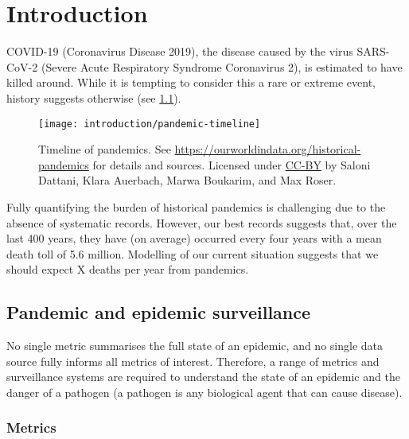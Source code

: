 \documentclass[thesis.tex]{subfiles}
\begin{document}
\chapter{Introduction} \label{intro}

COVID-19 (Coronavirus Disease 2019), the disease caused by the virus SARS-CoV-2 (Severe Acute Respiratory Syndrome Coronavirus 2), is estimated to have killed around.
While it is tempting to consider this a rare or extreme event, history suggests otherwise (see \cref{intro:fig:pandemic-timeline}).
\begin{figure}
    \texttt{[image: introduction/pandemic-timeline]}
    \caption[Timeline of pandemics.]{%
        Timeline of pandemics.
        See \url{https://ourworldindata.org/historical-pandemics} for details and sources.
        Licensed under \href{https://creativecommons.org/licenses/by/4.0/}{CC-BY} by Saloni Dattani, Klara Auerbach, Marwa Boukarim, and Max Roser.
    }
    \label{intro:fig:pandemic-timeline}
\end{figure}

Fully quantifying the burden of historical pandemics is challenging due to the absence of systematic records.
However, our best records suggests that, over the last 400 years, they have (on average) occurred every four years with a mean death toll of 5.6 million.
Modelling of our current situation suggests that we should expect X deaths per year from pandemics.


\section{Pandemic and epidemic surveillance}


No single metric summarises the full state of an epidemic, and no single data source fully informs all metrics of interest.
Therefore, a range of metrics and surveillance systems are required to understand the state of an epidemic and the danger of a pathogen (a pathogen is any biological agent that can cause disease).

\subsection{Metrics}
\end{document}
